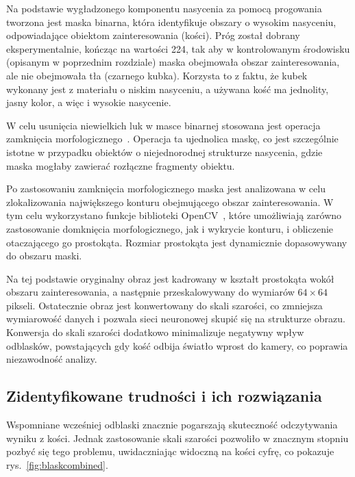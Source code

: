Na podstawie wygładzonego komponentu nasycenia za pomocą progowania tworzona jest maska binarna,
która identyfikuje obszary o wysokim nasyceniu, odpowiadające obiektom zainteresowania (kości).
Próg został dobrany eksperymentalnie, kończąc na wartości 224,
tak aby w kontrolowanym środowisku (opisanym w poprzednim rozdziale) maska obejmowała obszar zainteresowania,
ale nie obejmowała tła (czarnego kubka).
Korzysta to z faktu, że kubek wykonany jest z materiału o niskim nasyceniu,
a używana kość ma jednolity, jasny kolor, a więc i wysokie nasycenie.

W celu usunięcia niewielkich luk w masce binarnej stosowana jest operacja zamknięcia morfologicznego~\cite{morphological_closure}.
Operacja ta ujednolica maskę, co jest szczególnie istotne w przypadku obiektów o niejednorodnej strukturze nasycenia,
gdzie maska mogłaby zawierać rozłączne fragmenty obiektu.

Po zastosowaniu zamknięcia morfologicznego maska jest analizowana w celu
zlokalizowania największego konturu obejmującego obszar zainteresowania.
W tym celu wykorzystano funkcje biblioteki OpenCV~\cite{opencv_docs},
które umożliwiają zarówno zastosowanie domknięcia morfologicznego, jak i wykrycie konturu, i obliczenie otaczającego go prostokąta.
Rozmiar prostokąta jest dynamicznie dopasowywany do obszaru maski.

Na tej podstawie oryginalny obraz jest kadrowany w kształt prostokąta wokół obszaru zainteresowania,
a następnie przeskalowywany do wymiarów $64 \times 64$ pikseli.
Ostatecznie obraz jest konwertowany do skali szarości, co zmniejsza wymiarowość danych
i pozwala sieci neuronowej skupić się na strukturze obrazu.
Konwersja do skali szarości dodatkowo minimalizuje negatywny wpływ odblasków,
powstających gdy kość odbija światło wprost do kamery, co poprawia niezawodność analizy.


\subsection{Zidentyfikowane trudności i ich rozwiązania}\label{subsec:zidentyfikowane-trudnosci-i-ich-rozwiazania}

Wspomniane wcześniej odblaski znacznie pogarszają skuteczność odczytywania wyniku z kości.
Jednak zastosowanie skali szarości pozwoliło w znacznym stopniu pozbyć się tego problemu,
uwidaczniając widoczną na kości cyfrę, co pokazuje rys.~\ref{fig:blaskcombined}.

